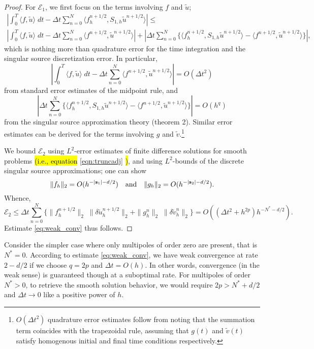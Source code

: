 \begin{proof}
For $\mathcal E_1$, we first focus on the terms involving $f$ and $\tilde u$;
\begin{equation*}
\begin{split}
	\left| \int_0^T \langle f, \tilde u\rangle \;  dt -
		\Delta t \sum_{n=0}^N \langle f_h^{n+1/2}, S_{1,h}\tilde u^{n+1/2}\rangle \right|
	\le \\
	\left| \int_0^T \langle f,\tilde u \rangle \; dt - \Delta t \sum_{n=0}^N \langle f^{n+1/2},\tilde u^{n+1/2}\rangle \right|
	+ \left| \Delta t \sum_{n=0}^N \Big\{ \langle f_h^{n+1/2}, S_{1,h}\tilde u^{n+1/2}\rangle - 
							     \langle f^{n+1/2}, \tilde u^{n+1/2} \rangle \Big\} \right |,
\end{split}
\end{equation*}
which is nothing more than quadrature error for the time integration and the singular source discretization error.
In particular,
\[
	\left| \int_0^T \langle f,\tilde u \rangle \; dt - \Delta t \sum_{n=0}^N \langle f^{n+1/2},\tilde u^{n+1/2}\rangle \right| = O(\Delta t^2)
\]
from standard error estimates of the midpoint rule, and
\[
	\left| \Delta t \sum_{n=0}^N \Big\{ \langle f_h^{n+1/2}, S_{1,h}\tilde u^{n+1/2}\rangle - 
							     \langle f^{n+1/2}, \tilde u^{n+1/2} \rangle \Big\} \right |
	= O(h^q)
\]
from the singular source approximation theory (theorem 2).
Similar error estimates can be derived for the terms involving $g$ and $\tilde v$.\footnote{$O(\Delta t^2)$ quadrature error estimates follow from noting that the summation term coincides with the trapezoidal rule, assuming that $g(t)$ and $\tilde v(t)$ satisfy homogenous initial and final time conditions respectively.}

We bound $\mathcal E_2$ using $L^2$-error estimates of finite difference solutions for smooth problems \hl{(i.e., equation }\ref{eqn:truncadj} \hl{)}, and using $L^2$-bounds of the discrete singular source approximations; one can show
\[
 	\| f_h\|_2 = O(h^{-|\mathbf s_1|-d/2}) \quad {\rm and} \quad 
	\| g_h\|_2 = O(h^{-|\mathbf s_2|-d/2}).
\]
Whence,
\[
	\mathcal E_2 \le \Delta t \sum_{n=0}^N \Big\{ \|f_h^{n+1/2}\|_2 \; \|\delta \tilde u_h^{n+1/2}\|_{2}
								+ \|g_h^{n}\|_2  \; \| \delta \tilde v_h^n\|_2 \Big\}
					= O((\Delta t^2+h^{2p})h^{-N^*-d/2}).
\]
Estimate \ref{eq:weak_conv} thus follows.
\end{proof}

Consider the simpler case where only multipoles of order zero are present, that is $N^*=0$.
According to estimate \ref{eq:weak_conv}, we have weak convergence at rate $2-d/2$ if we choose $q=2p$ and $\Delta t = O(h)$.
In other words, convergence (in the weak sense) is guaranteed though at a suboptimal rate.
For multipoles of order $N^*>0$, to retrieve the smooth solution behavior, we would require $2p > N^*+d/2$ and $\Delta t\to 0$ like a positive power of $h$.



